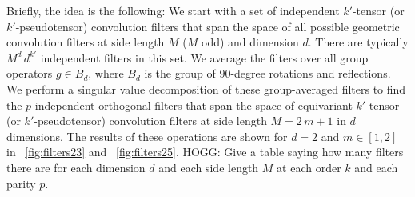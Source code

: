 \documentclass{article}
\theoremstyle{plain}
\newcommand{\figref}[1]{\figurename~\ref{#1}}
\begin{document}
Briefly, the idea is the following:
We start with a set of independent $k'$-tensor (or $k'$-pseudotensor) convolution filters that span the space of all possible geometric convolution filters at side length $M$ ($M$ odd) and dimension $d$.
There are typically $M^d\,d^{k'}$ independent filters in this set.
We average the filters over all group operators $g\in B_d$, where $B_d$ is the group of 90-degree rotations and reflections.
We perform a singular value decomposition of these group-averaged filters to find the $p$ independent orthogonal filters that span the space of equivariant $k'$-tensor (or $k'$-pseudotensor) convolution filters at side length $M=2\,m+1$ in $d$ dimensions.
The results of these operations are shown for $d=2$ and $m\in[1, 2]$ in \figref{fig:filters23} and \figref{fig:filters25}.
HOGG: Give a table saying how many filters there are for each dimension $d$ and each side length $M$ at each order $k$ and each parity $p$.
\end{document}
